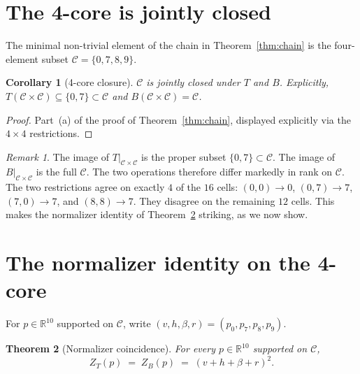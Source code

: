 \documentclass[11pt,reqno]{amsart}
\theoremstyle{plain}
\newtheorem{theorem}{Theorem}
\newtheorem{corollary}[theorem]{Corollary}
\theoremstyle{definition}
\theoremstyle{remark}
\newtheorem*{remark}{Remark}
\newcommand{\R}{\mathbb{R}}
\newcommand{\Cfour}{\mathcal{C}}
\begin{document}
\section{The 4-core is jointly closed}\label{sec:4core}

The minimal non-trivial element of the chain in
Theorem~\ref{thm:chain} is the four-element subset
$\Cfour=\{0,7,8,9\}$.

\begin{corollary}[4-core closure]\label{cor:4core}
$\Cfour$ is jointly closed under $T$ and $B$. Explicitly,
$T(\Cfour\times\Cfour)\subseteq\{0,7\}\subset\Cfour$ and
$B(\Cfour\times\Cfour)=\Cfour$.
\end{corollary}

\begin{proof}
Part~(a) of the proof of Theorem~\ref{thm:chain}, displayed
explicitly via the $4\times 4$ restrictions.
\end{proof}

\begin{remark}\label{rem:rank-disparity}
The image of $T\big|_{\Cfour\times\Cfour}$ is the proper subset
$\{0,7\}\subset\Cfour$. The image of $B\big|_{\Cfour\times\Cfour}$
is the full $\Cfour$. The two operations therefore differ
markedly in rank on $\Cfour$. The two restrictions agree on
exactly $4$ of the $16$ cells: $(0,0)\to 0$, $(0,7)\to 7$,
$(7,0)\to 7$, and $(8,8)\to 7$. They disagree on the remaining
$12$ cells. This makes the normalizer identity of
Theorem~\ref{thm:norm} striking, as we now show.
\end{remark}

\section{The normalizer identity on the 4-core}\label{sec:norm}

For $p\in\R^{10}$ supported on $\Cfour$, write
$(v,h,\beta,r)=(p_{0},p_{7},p_{8},p_{9})$.

\begin{theorem}[Normalizer coincidence]\label{thm:norm}
For every $p\in\R^{10}$ supported on $\Cfour$,
\[
Z_{T}(p)\;=\;Z_{B}(p)\;=\;(v+h+\beta+r)^{2}.
\]
\end{theorem}
\end{document}
